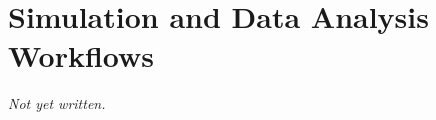 \chapter{Simulation and Data Analysis Workflows}\label{ch:simulation-data-pipelines}


\textit{Not yet written.}
